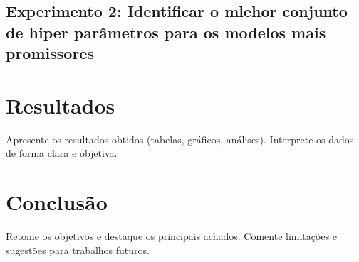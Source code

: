 \documentclass{article}
\begin{document}
\subsection{Experimento 2: Identificar o mlehor conjunto de hiper parâmetros para os modelos mais promissores}


\section{Resultados}
Apresente os resultados obtidos (tabelas, gráficos, análises). Interprete os dados de forma clara e objetiva.

\section{Conclusão}
Retome os objetivos e destaque os principais achados. Comente limitações e sugestões para trabalhos futuros.

\newpage
\end{document}
